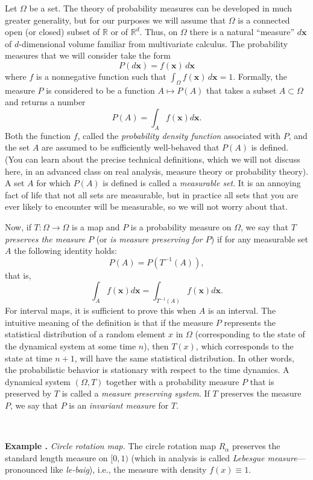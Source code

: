 \documentclass[12pt]{amsart}
\newcounter{example}
\newcommand{\beginexample}[1]{\ \\ \addtocounter{example}{1} \textbf{Example \arabic{example}.} \textit{#1.}}
\begin{document}
Let $\Omega$ be a set. The theory of probability measures can be developed in much greater generality, but for our purposes we will assume that $\Omega$ is a connected open (or closed) subset of $\mathbb{R}$ or of $\mathbb{R}^d$. Thus, on $\Omega$ there is a natural ``measure'' $d\mathbf{x}$ of $d$-dimensional volume familiar from multivariate calculus. The probability measures that we will consider take the form
$$ P(d\mathbf{x})=f(\mathbf{x})\,d\mathbf{x} $$
where $f$ is a nonnegative function such that $\int_{\Omega} f(\mathbf{x})\,d\mathbf{x} = 1$. Formally, the measure $P$ is considered to be a function $A\mapsto P(A)$ that takes a subset $A\subset \Omega$ and returns a number
$$ P(A) = \int_A f(\mathbf{x})d\mathbf{x}. $$
Both the function $f$, called the \emph{probability density function} associated with $P$, and the set $A$ are assumed to be sufficiently well-behaved that $P(A)$ is defined. (You can learn about the precise technical definitions, which we will not discuss here, in an advanced class on real analysis, measure theory or probability theory). A set $A$ for which $P(A)$ is defined is called a \emph{measurable set}. It is an annoying fact of life that not all sets are measurable, but in practice all sets that you are ever likely to encounter will be measurable, so we will not worry about that.

Now, if $T:\Omega\to \Omega$ is a map and $P$ is a probability measure on $\Omega$, we say that $T$ \emph{preserves the measure $P$} (or \emph{is measure preserving for $P$}) if for any measurable set $A$ the following identity holds:
$$ P(A) = P(T^{-1}(A)), $$
that is,
$$ \int_A f(\mathbf{x})d\mathbf{x} = \int_{T^{-1}(A)} f(\mathbf{x})d\mathbf{x}.
$$
For interval maps, it is sufficient to prove this when $A$ is an interval. The intuitive meaning of the definition is that if the measure $P$ represents the statistical distribution of a random element $x$ in $\Omega$ (corresponding to the state of the dynamical system at some time $n$), then $T(x)$, which corresponds to the state at time $n+1$, will have the same statistical distribution. In other words, the probabilistic behavior is stationary with respect to the time dynamics. A dynamical system $(\Omega, T)$ together with a probability measure $P$ that is preserved by $T$ is called a \emph{measure preserving system}. If $T$ preserves the measure $P$, we say that $P$ is an \emph{invariant measure} for $T$.

\beginexample{Circle rotation map} The circle rotation map $R_\alpha$ preserves the standard length measure on $[0,1)$ (which in analysis is called \emph{Lebesgue measure}---pronounced like \emph{le-baig}), i.e., the measure with density $f(x)\equiv 1$.
\end{document}
